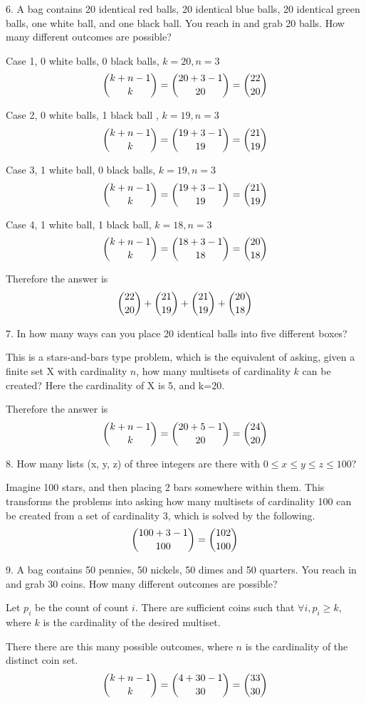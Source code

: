 \documentclass{idrisMemo}
\begin{document}
\begin{prooflist}{6. A bag contains 20 identical red balls, 20 identical blue
    balls, 20 identical green balls, one white ball, and one black ball. You
reach in and grab 20 balls. How many different outcomes are possible?}
\item Case 1, 0 white balls, 0 black balls, $k=20, n=3$
    $$ \dbinom{k+n-1}{k} = \dbinom{20+3-1}{20}=\dbinom{22}{20}$$
\item Case 2, 0 white balls, 1 black ball , $k=19, n=3$
    $$ \dbinom{k+n-1}{k} = \dbinom{19+3-1}{19}=\dbinom{21}{19}$$
\item Case 3, 1 white ball, 0 black balls, $k=19, n=3$
    $$ \dbinom{k+n-1}{k} = \dbinom{19+3-1}{19}=\dbinom{21}{19}$$
\item Case 4, 1 white ball, 1 black ball, $k=18, n=3$
    $$ \dbinom{k+n-1}{k} = \dbinom{18+3-1}{18}=\dbinom{20}{18}$$
\item Therefore the answer is
    $$ \dbinom{22}{20} +\dbinom{21}{19} +\dbinom{21}{19} +\dbinom{20}{18}$$
\end{prooflist}

\begin{prooflist}{7. In how many ways can you place 20 identical balls into five
    different boxes?}
\item This is a stars-and-bars type problem, which is the equivalent of asking,
    given a finite set X with cardinality $n$, how many multisets of cardinality
    $k$ can be created? Here the cardinality of X is 5, and k=20.
\item Therefore the answer is
    $$ \dbinom{k+n-1}{k} = \dbinom{20+5-1}{20}=\dbinom{24}{20}$$
\end{prooflist}

\begin{prooflist}{8. How many lists (x, y, z) of three integers are there with
    $0 \leq x \leq y \leq z \leq 100$?}
\item  Imagine 100 stars, and then placing 2 bars somewhere within them. This
    transforms the problems into asking how many multisets of cardinality 100
    can be created from a set of cardinality 3, which is solved by the
    following.
    $$ \dbinom{100+3-1}{100} = \dbinom{102}{100}$$
\item
\end{prooflist}

\begin{prooflist}{9. A bag contains 50 pennies, 50 nickels, 50 dimes and 50 quarters. You reach in and grab 30 coins. How many different outcomes are possible?}
\item Let $p_i$ be the count of count $i$. There are sufficient coins such that
    $\forall i, p_i\geq k$, where $k$ is the cardinality of the desired
    multiset.
\item There there are this many possible outcomes, where $n$ is the cardinality
    of the distinct coin set.
    $$ \dbinom{k+n-1}{k} = \dbinom{4+30-1}{30}=\dbinom{33}{30}$$
\end{prooflist}
\end{document}
